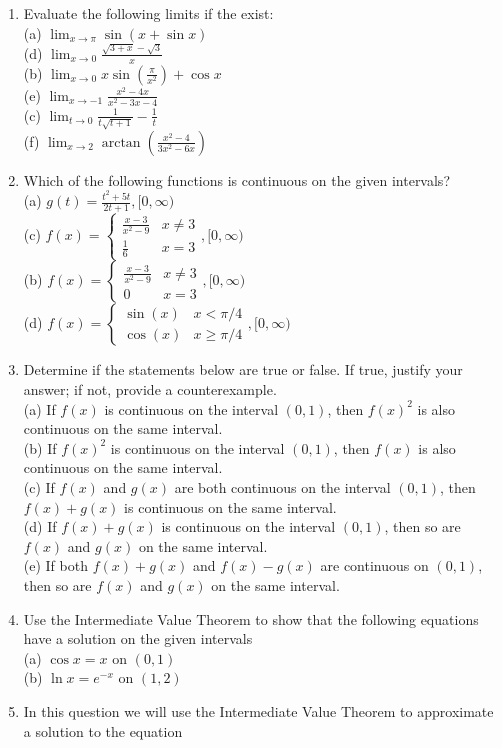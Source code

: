 \documentclass[10pt]{article}
\begin{document}
\begin{enumerate}
  \item Evaluate the following limits if the exist:\\
(a) $\lim _{x \rightarrow \pi} \sin (x+\sin x)$\\
(d) $\lim _{x \rightarrow 0} \frac{\sqrt{3+x}-\sqrt{3}}{x}$\\
(b) $\lim _{x \rightarrow 0} x \sin \left(\frac{\pi}{x^{2}}\right)+\cos x$\\
(e) $\lim _{x \rightarrow-1} \frac{x^{2}-4 x}{x^{2}-3 x-4}$\\
(c) $\lim _{t \rightarrow 0} \frac{1}{t \sqrt{t+1}}-\frac{1}{t}$\\
(f) $\lim _{x \rightarrow 2} \arctan \left(\frac{x^{2}-4}{3 x^{2}-6 x}\right)$
  \item Which of the following functions is continuous on the given intervals?\\
(a) $g(t)=\frac{t^{2}+5 t}{2 t+1},[0, \infty)$\\
(c) $f(x)=\left\{\begin{array}{ll}\frac{x-3}{x^{2}-9} & x \neq 3 \\ \frac{1}{6} & x=3\end{array},[0, \infty)\right.$\\
(b) $f(x)=\left\{\begin{array}{ll}\frac{x-3}{x^{2}-9} & x \neq 3 \\ 0 & x=3\end{array},[0, \infty)\right.$\\
(d) $f(x)=\left\{\begin{array}{ll}\sin (x) & x<\pi / 4 \\ \cos (x) & x \geq \pi / 4\end{array},[0, \infty)\right.$
  \item Determine if the statements below are true or false. If true, justify your answer; if not, provide a counterexample.\\
(a) If $f(x)$ is continuous on the interval $(0,1)$, then $f(x)^{2}$ is also continuous on the same interval.\\
(b) If $f(x)^{2}$ is continuous on the interval $(0,1)$, then $f(x)$ is also continuous on the same interval.\\
(c) If $f(x)$ and $g(x)$ are both continuous on the interval $(0,1)$, then $f(x)+g(x)$ is continuous on the same interval.\\
(d) If $f(x)+g(x)$ is continuous on the interval $(0,1)$, then so are $f(x)$ and $g(x)$ on the same interval.\\
(e) If both $f(x)+g(x)$ and $f(x)-g(x)$ are continuous on $(0,1)$, then so are $f(x)$ and $g(x)$ on the same interval.
  \item Use the Intermediate Value Theorem to show that the following equations have a solution on the given intervals\\
(a) $\cos x=x$ on $(0,1)$\\
(b) $\ln x=e^{-x}$ on $(1,2)$
  \item In this question we will use the Intermediate Value Theorem to approximate a solution to the equation
\end{enumerate}
\end{document}
